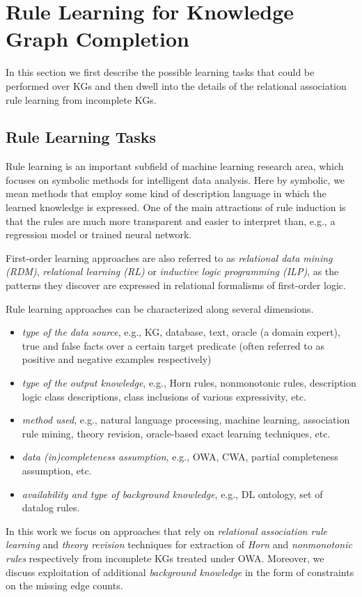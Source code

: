 \section{ Rule Learning for Knowledge Graph Completion}
\label{sec:rules_kg_completion}
In this section we first describe the possible learning tasks that could be performed over KGs and then dwell into the details of the relational association rule learning from incomplete KGs. 
\subsection{Rule Learning Tasks}
Rule learning is an important subfield of machine learning research area, which focuses on symbolic methods for intelligent data analysis. Here by symbolic, we mean methods that employ some kind of description language in which the learned knowledge is expressed. One of the main attractions of rule induction is that the rules are much more transparent and easier to interpret than, e.g., a regression model or trained neural network.

First-order learning approaches are also referred to as \emph{relational data mining (RDM)}, \emph{relational learning
(RL)} or \emph{inductive logic programming (ILP)}, as the patterns they discover are expressed in
relational formalisms of first-order logic.

Rule learning approaches can be characterized along several dimensions. 
\begin{itemize}
\item \emph{type of the data source}, e.g., KG, database, text, oracle (a domain expert), true and false facts over a certain target predicate (often referred to as positive and negative examples respectively)
\item \emph{type of the output knowledge}, e.g., Horn rules, nonmonotonic rules, description logic class descriptions, class inclusions of various expressivity, etc.
\item \emph{method used}, e.g., natural language processing, machine learning, association rule mining, theory revision, oracle-based exact learning techniques, etc.
\item \emph{data (in)completeness assumption}, e.g., OWA, CWA, partial completeness assumption, etc.
\item \emph{availability and type of background knowledge}, e.g., DL ontology, set of datalog rules.
\end{itemize}

In this work we focus on approaches that rely on \emph{relational association rule learning} and \emph{theory revision} techniques for extraction of \emph{Horn} and \emph{nonmonotonic rules}  respectively from incomplete KGs treated under OWA. Moreover, we discuss exploitation of additional \emph{background knowledge} in the form of constraints on the missing edge counts.

